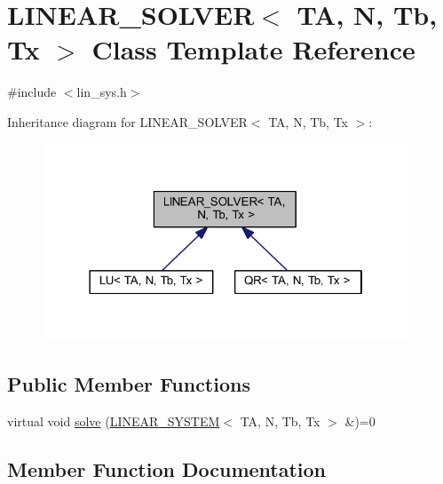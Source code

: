 \hypertarget{class_l_i_n_e_a_r___s_o_l_v_e_r}{}\section{L\+I\+N\+E\+A\+R\+\_\+\+S\+O\+L\+V\+ER$<$ TA, N, Tb, Tx $>$ Class Template Reference}
\label{class_l_i_n_e_a_r___s_o_l_v_e_r}


{\ttfamily \#include $<$lin\+\_\+sys.\+h$>$}



Inheritance diagram for L\+I\+N\+E\+A\+R\+\_\+\+S\+O\+L\+V\+ER$<$ TA, N, Tb, Tx $>$\+:\nopagebreak
\begin{figure}[H]
\begin{center}
\leavevmode
\includegraphics[width=310pt]{class_l_i_n_e_a_r___s_o_l_v_e_r__inherit__graph}
\end{center}
\end{figure}
\subsection*{Public Member Functions}
\begin{DoxyCompactItemize}
\item 
virtual void \mbox{\hyperlink{class_l_i_n_e_a_r___s_o_l_v_e_r_a83c4d3b280e57814ec091dd9f8927c24}{solve}} (\mbox{\hyperlink{class_l_i_n_e_a_r___s_y_s_t_e_m}{L\+I\+N\+E\+A\+R\+\_\+\+S\+Y\+S\+T\+EM}}$<$ TA, N, Tb, Tx $>$ \&)=0
\end{DoxyCompactItemize}


\subsection{Member Function Documentation}
\mbox{\label{class_l_i_n_e_a_r___s_o_l_v_e_r_a83c4d3b280e57814ec091dd9f8927c24}} 
